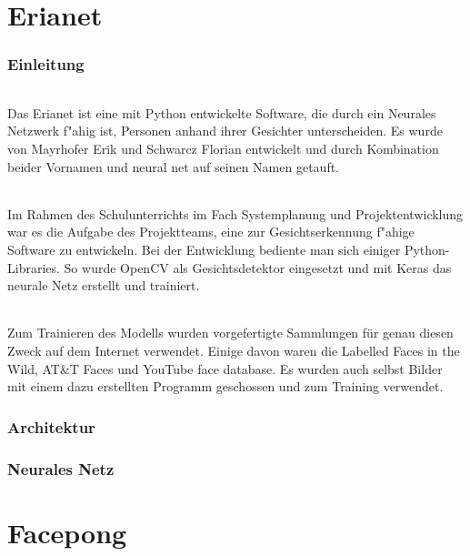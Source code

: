 \documentclass[12pt]{article}
\begin{document}
\tableofcontents
\newpage

\part{Erianet}
\section{Einleitung}
\paragraph{}
Das Erianet ist eine mit Python entwickelte Software, die
durch ein Neurales Netzwerk f"ahig ist,
Personen anhand ihrer Gesichter unterscheiden.
Es wurde von Mayrhofer Erik und Schwarcz Florian
entwickelt und durch Kombination beider Vornamen und \glqq neural net\grqq{}
auf seinen Namen getauft.
\paragraph{}
Im Rahmen des Schulunterrichts im Fach \glqq Systemplanung und Projektentwicklung\grqq{}
war es die Aufgabe des Projektteams, eine zur Gesichtserkennung
f"ahige Software zu entwickeln.
Bei der Entwicklung bediente man sich einiger Python-Libraries.
So wurde OpenCV als Gesichtsdetektor eingesetzt und mit Keras das neurale
Netz erstellt und trainiert.
\paragraph{}
Zum Trainieren des Modells wurden vorgefertigte Sammlungen für genau diesen
Zweck auf dem Internet verwendet. Einige davon waren die \glqq Labelled Faces in the Wild\grqq{},
\glqq AT\&T Faces\grqq{} und \glqq YouTube face database\grqq{}. Es wurden
auch selbst Bilder mit einem dazu erstellten Programm geschossen und zum Training verwendet.
\section{Architektur}

\section{Neurales Netz}


\part{Facepong}
\end{document}
